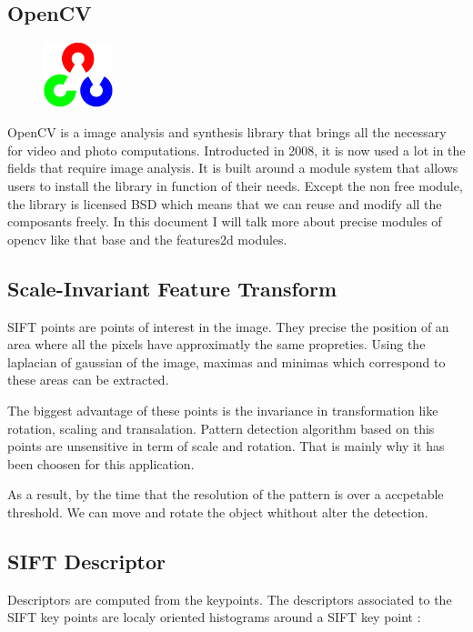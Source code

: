 \documentclass[english,a4paper,11pt]{report}
\begin{document}
	\subsection{OpenCV}
	\begin{figure}
	\vspace{-7mm}
	\includegraphics[width=2cm]{images_not_compressed/opencv_logo.png}
	\end{figure}
	\par OpenCV is a image analysis and synthesis library that brings all the necessary for video and photo computations. Introducted in 2008, it is now used a lot in the fields that require image analysis.
	It is built around a module system that allows users to install the library in function of their needs.
	Except the non free module, the library is licensed BSD which means that we can reuse and modify all the composants freely.
	In this document I will talk more about precise modules of opencv like that base and the features2d modules. 
	\subsection[SIFT points]{Scale-Invariant Feature Transform}
	\par SIFT points are points of interest in the image. They precise the position of an area where all the pixels have approximatly the same propreties. Using the laplacian of gaussian of the image, maximas and minimas which correspond to these areas can be extracted.
	\par The biggest advantage of these points is the invariance in transformation like rotation, scaling and transalation. Pattern detection algorithm based on this points are unsensitive in term of scale and rotation. That is mainly why it has been choosen for this application.
	\par As a result, by the time that the resolution of the pattern is over a accpetable threshold. We can move and rotate the object whithout alter the detection.
	
	\subsection[Descriptor]{SIFT Descriptor}
	\par Descriptors are computed from the keypoints. The descriptors associated to the SIFT key points are localy oriented histograms around a SIFT key point\cite{AM} :
	
\end{document}
